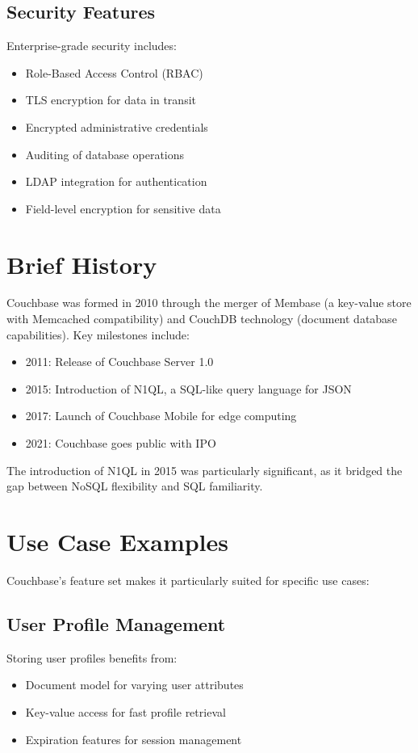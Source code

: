 \subsection{Security Features}
Enterprise-grade security includes:
\begin{itemize}
  \item Role-Based Access Control (RBAC)
  \item TLS encryption for data in transit
  \item Encrypted administrative credentials
  \item Auditing of database operations
  \item LDAP integration for authentication
  \item Field-level encryption for sensitive data
\end{itemize}

\section{Brief History}

Couchbase was formed in 2010 through the merger of Membase (a key-value store with Memcached compatibility) and CouchDB technology (document database capabilities). Key milestones include:

\begin{itemize}
  \item 2011: Release of Couchbase Server 1.0
  \item 2015: Introduction of N1QL, a SQL-like query language for JSON
  \item 2017: Launch of Couchbase Mobile for edge computing
  \item 2021: Couchbase goes public with IPO
\end{itemize}

The introduction of N1QL in 2015 was particularly significant, as it bridged the gap between NoSQL flexibility and SQL familiarity.

\section{Use Case Examples}

Couchbase's feature set makes it particularly suited for specific use cases:

\subsection{User Profile Management}
Storing user profiles benefits from:
\begin{itemize}
  \item Document model for varying user attributes
  \item Key-value access for fast profile retrieval
  \item Expiration features for session management
\end{itemize}

